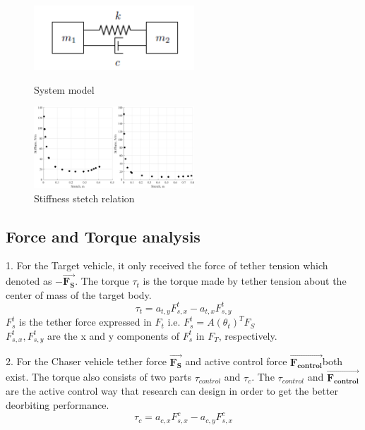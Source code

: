 \begin{figure}[htbp]
\centering
\begin{minipage}[t]{0.48\textwidth}
\centering
\includegraphics[width=6cm]{fig/simulation/Systemmodel}
\caption{System model~\cite{hovell2017experimental}}\label{simu-systemmodel}
\end{minipage}
\begin{minipage}[t]{0.48\textwidth}
\centering
\includegraphics[width=6cm]{fig/simulation/StiffnessStetchRelation}
\caption{Stiffness stetch relation~\cite{hovell2017experimental}}
\end{minipage}
\end{figure}

\subsection{Force and Torque analysis}

1. For the Target vehicle, it only received the force of tether tension which denoted as $\mathbf{-\overrightarrow{F_S}}$. The torque $\tau_t$ is the torque made by tether tension about the center of mass of the target body.
\begin{equation}
\tau_t = a_{t,y}F_{s,x}^t - a_{t,x}F_{s,y}^t
\end{equation}
\quad $F_{s}^t$ is the tether force expressed in $F_t$ i.e. $F_{s}^t = A(\theta_t)^TF_S$\\
\quad\quad $F_{s,x}^t,F_{s,y}^t$ are the x and y components of $F_{s}^t$ in $F_T$, respectively.   

2. For the Chaser vehicle tether force $\mathbf{\overrightarrow{F_S}}$ and active control force $\mathbf{\overrightarrow{F_{control}}}$both exist. The torque also consists of two parts $\tau_{control}$ and  $\tau_{c}$. The $\tau_{control}$ and $\mathbf{\overrightarrow{F_{control}}}$ are the active control way that research can design in order to get the better deorbiting performance.
\begin{equation}
\tau_c = a_{c,x}F_{s,x}^c - a_{c,y}F_{s,x}^c
\end{equation}

